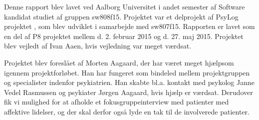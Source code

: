 Denne rapport blev lavet ved Aalborg Universitet i andet semester af Software kandidat studiet af gruppen sw808f15.
Projektet var et delprojekt af PsyLog projektet \citep{misc:faellesrapp}, som blev udviklet i samarbejde med sw807f15.
Rapporten er lavet som en del af P8 projektet mellem d. 2. februar 2015 og d. 27. maj 2015.
Projektet blev vejledt af Ivan Aaen, hvis vejledning var meget værdsat.

Projektet blev foreslået af Morten Aagaard, der har været meget hjælpsom igennem projektforløbet.
Han har fungeret som bindeled mellem projektgruppen og specialister indenfor psykiatrien. 
Han skabte bl.a. kontakt med psykolog Janne Vedel Rasmussen og psykiater Jørgen Aagaard, hvis hjælp er værdsat.
Derudover fik vi mulighed for at afholde et fokusgruppeinterview med patienter med affektive lidelser, og der skal derfor også lyde en tak til de involverede patienter.